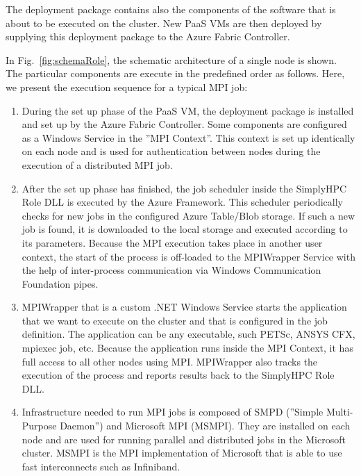 \documentclass[3p,times]{elsarticle}
\begin{document}

The deployment package contains also the components of the software that is about to be executed on the cluster.
New PaaS VMs are then deployed by supplying this deployment package to the Azure Fabric Controller.

In Fig.~\ref{fig:schemaRole}, the schematic architecture of a single node is shown. The particular components are execute in the predefined order as follows. Here, we present the execution sequence for a typical MPI job:

\begin{enumerate}
	\item During the set up phase of the PaaS VM, the deployment package is installed and set up by the Azure Fabric Controller. Some components are configured as a Windows Service in the ''MPI Context''. This context is set up identically on each node and is used for authentication between nodes during the execution of a distributed MPI job.

	\item After the set up phase has finished, the job scheduler inside the SimplyHPC Role DLL is executed by the Azure Framework. This scheduler periodically checks for new jobs in the configured Azure Table/Blob storage. If such a new job is found, it is downloaded to the local storage and executed according to its parameters. Because the MPI execution takes place in another user context, the start of the process is off-loaded to the MPIWrapper Service with the help of inter-process communication via Windows Communication Foundation pipes.

	\item MPIWrapper that is a custom .NET Windows Service starts the application that we want to execute on the cluster and that is configured in the job definition. The application can be any executable, such PETSc, ANSYS CFX, mpiexec job, etc. Because the application runs inside the MPI Context, it has full access to all other nodes using MPI. MPIWrapper also tracks the execution of the process and reports results back to the SimplyHPC Role DLL.

	\item Infrastructure needed to run MPI jobs is composed of SMPD (''Simple Multi-Purpose Daemon'') and Microsoft MPI (MSMPI). They are installed on each node and are used for running parallel and distributed jobs in the Microsoft cluster. MSMPI is the MPI implementation of Microsoft that is able to use fast interconnects such as Infiniband.
\end{enumerate}
\end{document}
